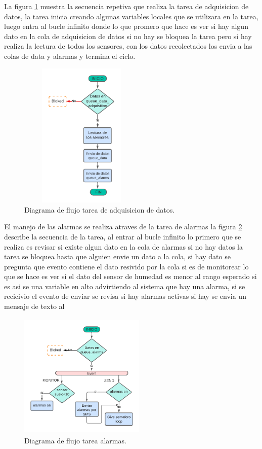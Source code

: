 \clearpage
La figura \ref{fig:Df tarea adquisicion} muestra la secuencia repetiva que realiza la tarea de adquisicion de datos, la tarea inicia creando algunas variables locales que se utilizara en la tarea, luego entra al bucle infinito donde lo que promero que hace es ver si hay algun dato en la cola de adquisicion de datos si no hay se bloquea la tarea pero si hay realiza la lectura de todos los sensores, con los datos recolectados los envia a las colas de data y alarmas y termina el ciclo.
\begin{figure}[htbp]
  \centering
	\includegraphics[width=6cm, height=7cm]{./Figures/DF task adquisicion.png}
	\caption{Diagrama de flujo tarea de adquisicion de datos.}
	\label{fig:Df tarea adquisicion}
\end{figure}

El manejo de las alarmas se realiza atraves de la tarea de alarmas la figura \ref{fig:Df tarea alarmas} describe la secuencia de la tarea, 
al entrar al bucle infinito lo primero que se realiza es revisar si existe algun dato en la cola de alarmas si no hay datos la tarea se bloquea hasta que alguien envie un dato a la cola, si hay dato se pregunta que evento contiene el dato resivido por la cola si es de monitorear lo que se hace es ver si el dato del sensor de humedad es menor al rango esperado si es asi se una variable en alto advirtiendo al sistema que hay una alarma, si se recicivio el evento de enviar se revisa si hay alarmas activas si hay se envia un mensaje de texto al 

\begin{figure}[htbp]
  \centering
	\includegraphics[width=6cm, height=6cm]{./Figures/DF_alarms.png}
	\caption{Diagrama de flujo tarea alarmas.}
	\label{fig:Df tarea alarmas}
\end{figure}

